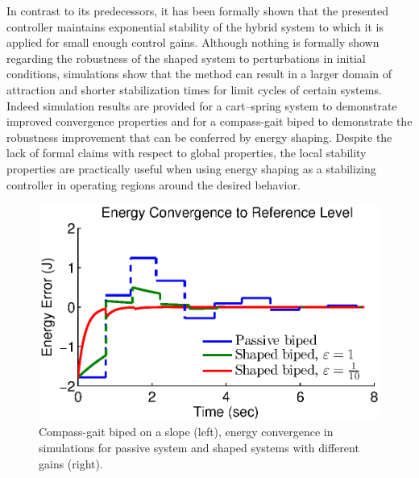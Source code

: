 \documentclass[english]{article}
\begin{document}
% 
% 
% 


In contrast to its predecessors, it has been formally shown that the presented
controller maintains exponential stability of the hybrid system to which it is
applied for small enough control gains.
%
Although nothing is formally shown regarding the robustness of the shaped system
to perturbations in initial conditions, simulations show that the method can
result in a larger domain of attraction and shorter stabilization times for
limit cycles of certain systems.
%
Indeed simulation results are provided for a cart--spring system to demonstrate
improved convergence properties and for a compass-gait biped to demonstrate
the robustness improvement that can be conferred by energy shaping.
%
Despite the lack of formal claims with respect to global properties, the local
stability properties are practically useful when using energy shaping as a
stabilizing controller in operating regions around the desired behavior.
%

\begin{figure}
  \centering
  \def\svgwidth{0.25\columnwidth}
   \hspace{3em}
  \includegraphics[width=0.45\columnwidth]{cg-energy-comp}
  \caption{Compass-gait biped on a slope (left), energy convergence in
    simulations for passive system and shaped systems with different gains (right).}
  \label{fig:simulation-model}
  \vspace{-1em}
\end{figure}




\end{document}

